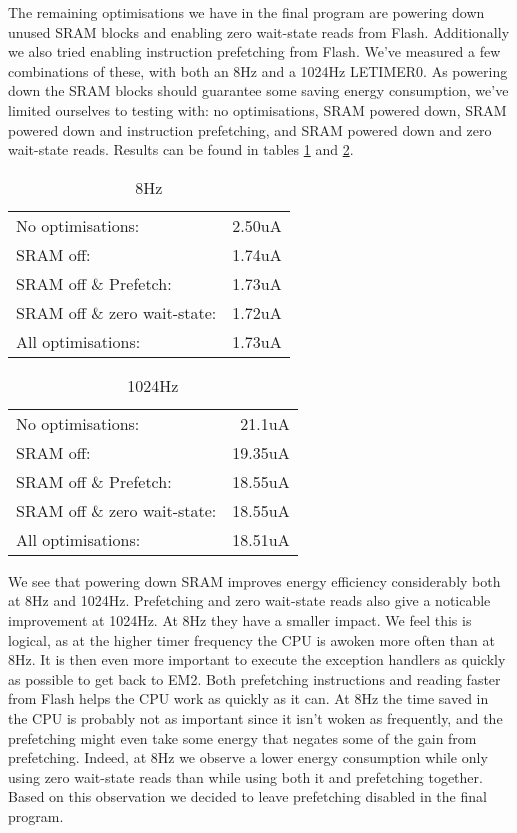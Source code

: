 The remaining optimisations we have in the final program are powering down
unused SRAM blocks and enabling zero wait-state reads from Flash. Additionally
we also tried enabling instruction prefetching from Flash. We've measured a few
combinations of these, with both an 8Hz and a 1024Hz LETIMER0. As powering down
the SRAM blocks should guarantee some saving energy consumption, we've limited
ourselves to testing with: no optimisations, SRAM powered down, SRAM powered
down and instruction prefetching, and SRAM powered down and zero wait-state
reads. Results can be found in tables \ref{tab:8Hz} and \ref{tab:1024Hz}.  
\begin{table}
\caption{8Hz}
\centering
\label{tab:8Hz}
\begin{tabular}{l r}
	No optimisations:&2.50uA\\
	SRAM off:&1.74uA\\
	SRAM off \& Prefetch:&1.73uA\\
	SRAM off \& zero wait-state:&1.72uA\\
	All optimisations:&1.73uA
\end{tabular}
\end{table}
\begin{table}
\caption{1024Hz}
\centering
\label{tab:1024Hz}
\begin{tabular}{l r}
	No optimisations:&21.1uA\\
	SRAM off:&19.35uA\\
	SRAM off \& Prefetch:&18.55uA\\
	SRAM off \& zero wait-state:&18.55uA\\
	All optimisations:&18.51uA
\end{tabular}
\end{table}

We see that powering down SRAM improves energy efficiency considerably both at
8Hz and 1024Hz. Prefetching and zero wait-state reads also give a noticable
improvement at 1024Hz. At 8Hz they have a smaller impact. We feel this is
logical, as at the higher timer frequency the CPU is awoken more often than at
8Hz. It is then even more important to execute the exception handlers as quickly
as possible to get back to EM2. Both prefetching instructions and reading faster
from Flash helps the CPU work as quickly as it can. At 8Hz the time saved in the
CPU is probably not as important since it isn't woken as frequently, and the
prefetching might even take some energy that negates some of the gain from
prefetching. Indeed, at 8Hz we observe a lower energy consumption while only
using zero wait-state reads than while using both it and prefetching together.
Based on this observation we decided to leave prefetching disabled in the final
program.

